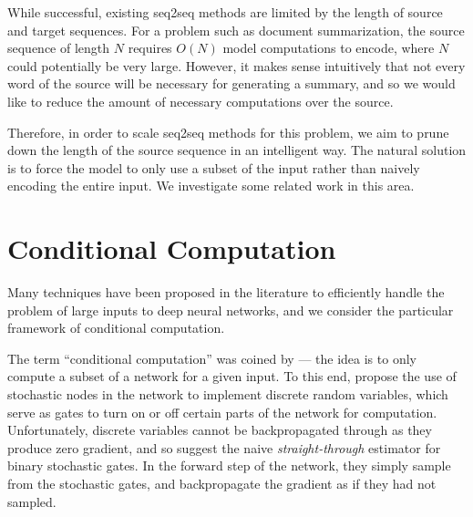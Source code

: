 \documentclass[12pt]{report}
\begin{document}
While successful, existing seq2seq methods are limited by the length of source and target sequences. For a problem such as document summarization, the source sequence of length $N$ requires $O(N)$ model computations to encode, where $N$ could potentially be very large. However, it makes sense intuitively that not every word of the source will be necessary for generating a summary, and so we would like to reduce the amount of necessary computations over the source.

Therefore, in order to scale seq2seq methods for this problem, we aim to prune down the length of the source sequence in an intelligent way. The natural solution is to force the model to only use a subset of the input rather than naively encoding the entire input. We investigate some related work in this area.


\section{Conditional Computation}




Many techniques have been proposed in the literature to efficiently handle the problem of large inputs to deep neural networks, and we consider the particular framework of conditional computation.

The term ``conditional computation'' was coined by \citet{BengioLC13} --- the idea is to only compute a subset of a network for a given input. 
To this end, \citet{BengioLC13} propose the use of stochastic nodes in the network to implement discrete random variables, which serve as gates to turn on or off certain parts of the network for computation.
Unfortunately, discrete variables cannot be backpropagated through as they produce zero gradient, and so \citet{BengioLC13} suggest the naive \emph{straight-through} estimator for binary stochastic gates.
In the forward step of the network, they simply sample from the stochastic gates, and backpropagate the gradient as if they had not sampled.
\end{document}
